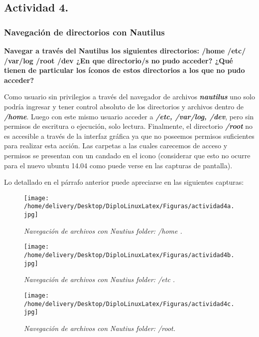 \documentclass[a4paper,11pt,spanish]{article} %
\begin{document}
\pagebreak

\subsection{Actividad 4.}

 \subsubsection{Navegación de directorios con Nautilus}

\textbf{Navegar a través del Nautilus los siguientes directorios:
/home
/etc/
/var/log
/root
/dev
¿En que directorio/s no pudo acceder? ¿Qué tienen de particular los íconos de estos directorios a los que no pudo acceder?\\}

Como usuario sin privilegios a través del navegador de archivos \textbf{\emph{nautilus}}
uno solo podría ingresar y tener control absoluto de los directorios
y archivos dentro de \textbf{\emph{/home}}. Luego con este mismo usuario acceder a \textbf{\emph{/etc, /var/log, /dev}}, pero
sin permisos de escritura o ejecución, solo lectura. Finalmente, el directorio \textbf{\emph{/root}} no es 
accesible a través de la interfaz gráfica ya que no poseemos permisos suficientes para realizar esta
acción. Las carpetas a las cuales carecemos de acceso y permisos se presentan con un candado en el 
icono (considerar que esto no ocurre para el nuevo ubuntu 14.04 como puede verse en las capturas de 
pantalla).

Lo detallado en el párrafo anterior puede apreciarse en las siguientes capturas:

\begin{figure}[h!] 
\centering
\texttt{[image: /home/delivery/Desktop/DiploLinuxLatex/Figuras/actividad4a.jpg]}
\caption{\emph{Navegación de archivos con Nautius folder: /home .}}
\end{figure}

\begin{figure}[h!] 
\centering
\texttt{[image: /home/delivery/Desktop/DiploLinuxLatex/Figuras/actividad4b.jpg]}
\caption{\emph{Navegación de archivos con Nautius folder: /etc .}}
\end{figure}

\begin{figure}[h!] 
\centering
\texttt{[image: /home/delivery/Desktop/DiploLinuxLatex/Figuras/actividad4c.jpg]}
\caption{\emph{Navegación de archivos con Nautius folder: /root.}}
\end{figure}
\end{document}
